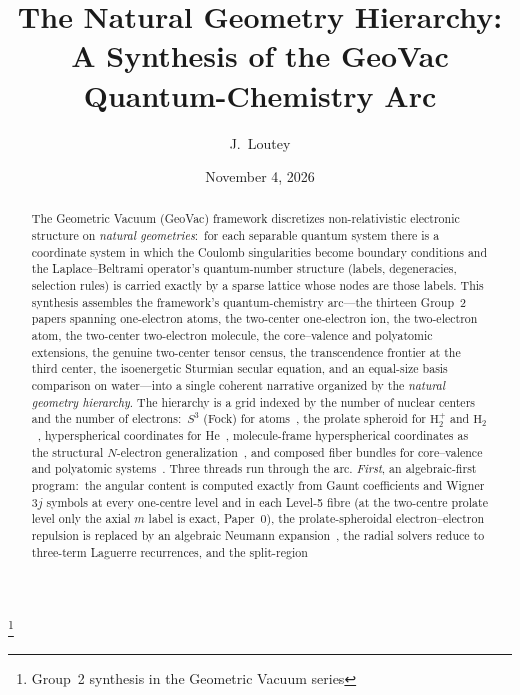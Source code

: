 \documentclass[aps,pra,twocolumn,superscriptaddress,longbibliography]{revtex4-2}
\begin{document}
\title{The Natural Geometry Hierarchy:\\
A Synthesis of the GeoVac Quantum-Chemistry Arc}
\thanks{Group~2 synthesis in the Geometric Vacuum series}

\author{J.~Loutey}

\date{November 4, 2026}


\begin{abstract}
The Geometric Vacuum (GeoVac) framework discretizes non-relativistic
electronic structure on \emph{natural geometries}:\ for each separable
quantum system there is a coordinate system in which the Coulomb
singularities become boundary conditions and the Laplace--Beltrami
operator's quantum-number structure (labels, degeneracies, selection
rules) is carried exactly by a sparse lattice whose nodes are those
labels.  This synthesis assembles the framework's quantum-chemistry
arc---the thirteen Group~2 papers spanning one-electron atoms, the
two-center one-electron ion, the two-electron atom, the two-center
two-electron molecule, the core--valence and polyatomic
extensions, the genuine two-center tensor census, the transcendence
frontier at the third center, the isoenergetic Sturmian secular
equation, and an equal-size basis comparison on water---into a single
coherent narrative organized by the
\emph{natural geometry hierarchy}.  The hierarchy is a grid indexed by
the number of nuclear centers and the number of electrons:\ $S^3$
(Fock) for atoms~\cite{loutey_paper7}, the prolate spheroid for
$\mathrm{H}_2^+$ and $\mathrm{H}_2$~\cite{loutey_paper11,loutey_paper12},
hyperspherical coordinates for
He~\cite{loutey_paper13}, molecule-frame hyperspherical coordinates as
the structural $N$-electron generalization~\cite{loutey_paper15}, and
composed fiber bundles for
core--valence and polyatomic systems~\cite{loutey_paper17,
loutey_paper19}.  Three threads run through the arc.  \emph{First}, an
algebraic-first program:\ the angular content is computed exactly from
Gaunt coefficients and Wigner $3j$ symbols at every one-centre level
and in each Level-5 fibre (at the two-centre prolate level only the
axial $m$ label is exact, Paper~0), the
prolate-spheroidal electron--electron repulsion is replaced by an
algebraic Neumann expansion~\cite{loutey_paper12}, the radial solvers
reduce to three-term Laguerre recurrences, and the split-region

\end{abstract}
\end{document}

